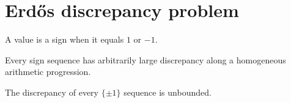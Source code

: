 \section{Erd\H{o}s discrepancy problem}

\begin{definition}
\label{def:edp-sign}
\leanok
A value is a sign when it equals $1$ or $-1$.
\end{definition}

\begin{definition}
\label{def:edp-unbounded}
\leanok
Every sign sequence has arbitrarily large discrepancy along a homogeneous arithmetic progression.
\end{definition}

\begin{theorem}
\label{thm:erdos-discrepancy}
\notready
{}
The discrepancy of every $\{\pm1\}$ sequence is unbounded.
\end{theorem}
